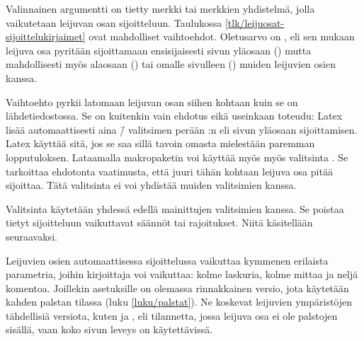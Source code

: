 
Valinnainen argumentti  on tietty merkki tai merkkien
yhdistelmä, jolla vaikutetaan leijuvan osan sijoitteluun. Taulukossa
\ref{tlk/leijuosat-sijoittelukirjaimet} ovat mahdolliset vaihtoehdot.
Oletusarvo on , eli sen mukaan leijuva osa pyritään
sijoittamaan ensisijaisesti sivun yläosaan () mutta
mahdollisesti myös alaosaan () tai omalle sivulleen ()
muiden leijuvien osien kanssa.

Vaihtoehto  pyrkii latomaan leijuvan osan siihen kohtaan kuin
se on lähdetiedostossa. Se on kuitenkin vain ehdotus eikä useinkaan
toteudu: Latex lisää automaattisesti aina \=/ valitsimen perään
:n eli sivun yläosaan sijoittamisen. Latex käyttää sitä, jos se
saa sillä tavoin omasta mielestään paremman lopputuloksen. Lataamalla
makropaketin  voi käyttää myös myös
valitsinta . Se tarkoittaa ehdotonta vaatimusta, että juuri
tähän kohtaan leijuva osa pitää sijoittaa. Tätä valitsinta ei voi
yhdistää muiden valitsimien kanssa.

Valitsinta \koodi{!} käytetään yhdessä edellä mainittujen valitsimien
 kanssa. Se poistaa tietyt sijoitteluun vaikuttavat säännöt
tai rajoitukset. Niitä käsitellään seuraavaksi.

Leijuvien osien automaattisessa sijoittelussa vaikuttaa kymmenen
erilaista parametria, joihin kirjoittaja voi vaikuttaa: kolme laskuria,
kolme mittaa ja neljä komentoa. Joillekin asetuksille on olemassa
rinnakkainen versio, jota käytetään kahden palstan tilassa (luku
\ref{luku/palstat}). Ne koskevat leijuvien ympäristöjen tähdellisiä
versiota, kuten  ja , eli
tilannetta, jossa leijuva osa ei ole palstojen sisällä, vaan koko sivun
leveys on käytettävissä.

